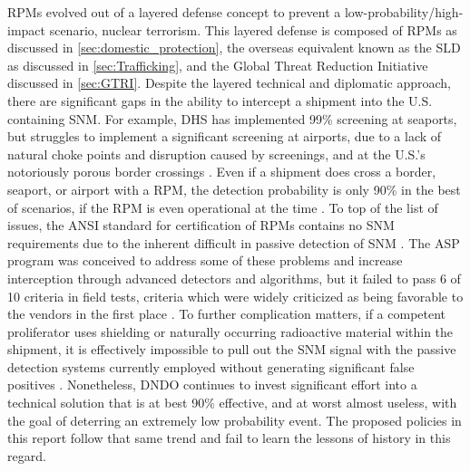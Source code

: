 \documentclass{report}
\begin{document}
RPMs evolved out of a layered defense concept to prevent a low-probability/high-impact scenario, nuclear terrorism. This layered defense is composed of RPMs as discussed in \autoref{sec:domestic_protection}, the overseas equivalent known as the SLD as discussed in \autoref{sec:Trafficking}, and the Global Threat Reduction Initiative discussed in \autoref{sec:GTRI}.  Despite the layered technical and diplomatic approach, there are significant gaps in the ability to intercept a shipment into the U.S. containing SNM.  For example, DHS has implemented 99\% screening at seaports, but struggles to implement a significant screening at airports, due to a lack of natural choke points and disruption caused by screenings, and at the U.S.'s notoriously porous border crossings \cite{DepartmentofHomelandSecurityDHS2013,GovernmentAccountabilityOffice2012}.  Even if a shipment does cross a border, seaport, or airport with a RPM, the detection probability is only 90\% in the best of scenarios, if the RPM is even operational at the time \cite{DepartmentofHomelandSecurityDHS2013,DepartmentofHomelandSecurityDHS2006}.  To top of the list of issues, the ANSI standard for certification of RPMs contains no SNM requirements due to the inherent difficult in passive detection of SNM \cite{Ansi2007}.  The ASP program was conceived to address some of these problems and increase interception through advanced detectors and algorithms, but it failed to pass 6 of 10 criteria in field tests, criteria which were widely criticized as being favorable to the vendors in the first place \cite{UnitedStatesGovernmentAccountabilityOffice2013}. To further complication matters, if a competent proliferator uses shielding or naturally occurring radioactive material within the shipment, it is effectively impossible to pull out the SNM signal with the passive detection systems currently employed without generating significant false positives \cite{UnitedStatesGovernmentAccountabilityOffice2013,UnitedStatesCongress.House.CommitteeonHomelandSecurity.SubcommitteeonEmergingThreatsCybersecurity2007}.  Nonetheless, DNDO continues to invest significant effort into a technical solution that is at best 90\% effective, and at worst almost useless, with the goal of deterring an extremely low probability event.  The proposed policies in this report follow that same trend and fail to learn the lessons of history in this regard.      
\end{document}
